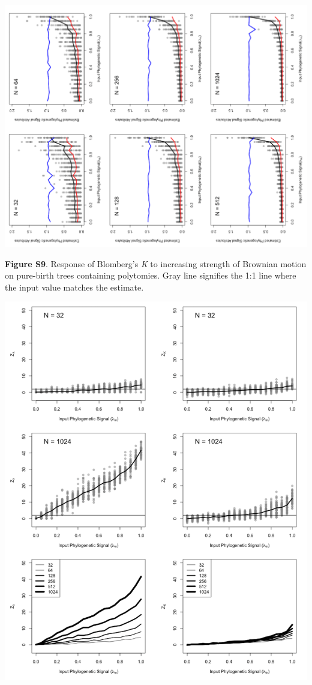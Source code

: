 \documentclass[
]{article}
\begin{document}
\includegraphics[width=0.95\linewidth]{fig.S9}

\textbf{Figure S9}. Response of Blomberg's \textit{K} to increasing
strength of Brownian motion on pure-birth trees containing polytomies.
Gray line signifies the 1:1 line where the input value matches the
estimate.

\includegraphics[width=0.95\linewidth]{fig.S10}
\end{document}
